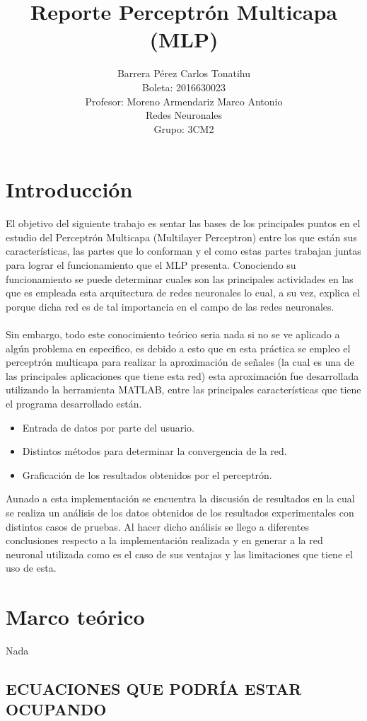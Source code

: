 \documentclass[12pt, titlepage]{article}
\title{Reporte Perceptrón Multicapa (MLP)}
\author{Barrera Pérez Carlos Tonatihu \\Boleta: 2016630023\\ Profesor: Moreno 
Armendariz Marco Antonio \\ Redes Neuronales \\ Grupo: 3CM2 }
\begin{document}
\maketitle
\tableofcontents
\newpage

\section{Introducción}
El objetivo del siguiente trabajo es sentar las bases de los principales puntos 
en el estudio del Perceptrón Multicapa (Multilayer Perceptron) entre los que 
están sus características, las partes que lo conforman y el como estas partes 
trabajan juntas para lograr el funcionamiento que el MLP presenta. Conociendo 
su funcionamiento se puede determinar cuales son las principales actividades en 
las que es empleada esta arquitectura de redes neuronales lo cual, a su vez, 
explica el porque dicha red es de tal importancia en el campo de las redes 
neuronales.
\\\\
Sin embargo, todo este conocimiento teórico seria nada si no se ve aplicado a 
algún problema en especifico, es debido a esto que en esta práctica se empleo 
el perceptrón multicapa para realizar la aproximación de señales (la cual es 
una de las principales aplicaciones que tiene esta red) esta aproximación fue 
desarrollada utilizando la herramienta MATLAB, entre las principales 
características que tiene el programa desarrollado están.
\begin{itemize}
 \item Entrada de datos por parte del usuario.
 \item Distintos métodos para determinar la convergencia de la red.
 \item Graficación de los resultados obtenidos por el perceptrón.
\end{itemize}
Aunado a esta implementación se encuentra la discusión de resultados en la cual 
se realiza un análisis de los datos obtenidos de los resultados 
experimentales con distintos casos de pruebas. Al hacer dicho análisis se llego 
a diferentes conclusiones respecto a la implementación realizada y en generar a 
la red neuronal utilizada como es el caso de sus ventajas y las limitaciones 
que tiene el uso de esta.

\newpage
\section{Marco teórico}
Nada \cite{libro1}
\subsection{ECUACIONES QUE PODRÍA ESTAR OCUPANDO}
\end{document}
